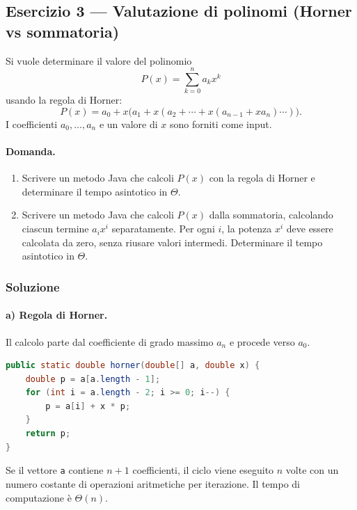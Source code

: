 \subsection{Esercizio 3 --- Valutazione di polinomi (Horner vs sommatoria)}
\label{sub:es3-horner}

Si vuole determinare il valore del polinomio
\[
P(x) = \sum_{k=0}^{n} a_k x^k
\]
usando la regola di Horner:
\[
P(x) = a_0 + x\bigl(a_1 + x(a_2 + \cdots + x(a_{n-1} + x a_n)\cdots)\bigr).
\]
I coefficienti $a_0,\ldots,a_n$ e un valore di $x$ sono forniti come input.

\paragraph{Domanda.}
\begin{enumerate}
	\item Scrivere un metodo Java che calcoli $P(x)$ con la regola di Horner e determinare
	il tempo asintotico in $\Theta$.
	\item Scrivere un metodo Java che calcoli $P(x)$ dalla sommatoria, calcolando ciascun
	termine $a_i x^i$ separatamente. Per ogni $i$, la potenza $x^i$ deve essere calcolata
	da zero, senza riusare valori intermedi. Determinare il tempo asintotico in $\Theta$.
\end{enumerate}

\subsubsection*{Soluzione}

\paragraph{a) Regola di Horner.}
Il calcolo parte dal coefficiente di grado massimo $a_n$ e procede verso $a_0$.

\begin{lstlisting}[language=Java, caption={Valutazione con la regola di Horner}]
public static double horner(double[] a, double x) {
    double p = a[a.length - 1];
    for (int i = a.length - 2; i >= 0; i--) {
        p = a[i] + x * p;
    }
    return p;
}
\end{lstlisting}

Se il vettore \texttt{a} contiene $n+1$ coefficienti, il ciclo viene eseguito $n$ volte con
un numero costante di operazioni aritmetiche per iterazione. Il tempo di computazione è
$\Theta(n)$.

